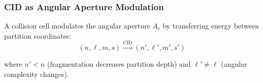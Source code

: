 \subsubsection{CID as Angular Aperture Modulation}

\begin{theorem}
\label{thm:collision_modulator}
A collision cell modulates the angular aperture $A_\ell$ by transferring energy between partition coordinates:
\begin{equation}
(n, \ell, m, s) \xrightarrow{\text{CID}} (n', \ell', m', s')
\end{equation}

where $n' < n$ (fragmentation decreases partition depth) and $\ell' \neq \ell$ (angular complexity changes).
\end{theorem}

